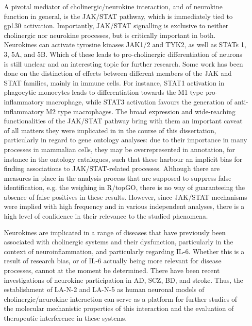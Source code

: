 A pivotal mediator of cholinergic/neurokine interaction, and of neurokine function in general, is the JAK/STAT pathway, which is immediately tied to gp130 activation. Importantly, JAK/STAT signalling is exclusive to neither cholinergic nor neurokine processes, but is critically important in both. Neurokines can activate tyrosine kinases JAK1/2 and TYK2, as well as STATs 1, 3, 5A, and 5B.\cite{Rawlings2004} Which of these leads to pro-cholinergic differentiation of neurons is still unclear and an interesting topic for further research.  Some work has been done on the distinction of effects between different members of the JAK and STAT families, mainly in immune cells. For instance, STAT1 activation in phagocytic monocytes leads to differentiation towards the M1 type pro-inflammatory macrophage, while STAT3 activation favours the generation of anti-inflammatory M2 type macrophages.\cite{Wang2014} The broad expression and wide-reaching functionalities of the JAK/STAT pathway bring with them an important caveat of all matters they were implicated in in the course of this dissertation, particularly in regard to gene ontology analyses: due to their importance in many processes in mammalian cells, they may be overrepresented in annotation, for instance in the ontology catalogues, such that these harbour an implicit bias for finding associations to JAK/STAT-related processes. Although there are measures in place in the analysis process that are supposed to suppress false identification, e.g. the weighing in R/topGO, there is no way of guaranteeing the absence of false positives in these results. However, since JAK/STAT mechanisms were implied with high frequency and in various independent analyses, there is a high level of confidence in their relevance to the studied phenomena.    

Neurokines are implicated in a range of diseases that have previously been associated with cholinergic systems and their dysfunction, particularly in the context of neuroinflammation, and particularly regarding IL-6. Whether this is a result of research bias, or of IL-6 actually being more relevant for disease processes, cannot at the moment be determined. There have been recent investigations of neurokine participation in AD,\cite{Pasquin2015,Baazaoui2018} SCZ,\cite{Chase2016,Girgis2018} BD,\cite{Goldsmith2016,Lu2019,Wiener2019} and stroke.\cite{Kang2012,Kang2013,Bustamante2014,Armstead2019} Thus, the establishment of LA-N-2 and LA-N-5 as human neuronal models of cholinergic/neurokine interaction can serve as a platform for further studies of the molecular mechanistic properties of this interaction and the evaluation of therapeutic interference in these systems.
 

